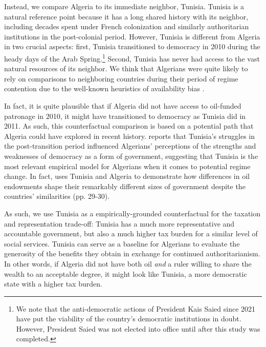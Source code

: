 \documentclass[12pt, letterpaper]{article}
\begin{document}
Instead, we compare Algeria to its immediate neighbor, Tunisia. Tunisia is a natural reference point because it has a long shared history with its neighbor, including decades spent under French colonization and similarly authoritarian institutions in the post-colonial period. However, Tunisia is different from Algeria in two crucial aspects: first, Tunisia transitioned to democracy in 2010 during the heady days of the Arab Spring.\footnote{We note that the anti-democratic actions of President Kais Saied since 2021 have put the viability of the country's democratic institutions in doubt. However, President Saied was not elected into office until after this study was completed.} Second, Tunisia has never had access to the vast natural resources of its neighbor. We think that Algerians were quite likely to rely on comparisons to neighboring countries during their period of regime contention due to the well-known heuristics of availability bias \parencite{weyland_arab_2012}. 

In fact, it is quite plausible that if Algeria did not have access to oil-funded patronage in 2010, it might have transitioned to democracy as Tunisia did in 2011. As such, this counterfactual comparison is based on a potential path that Algeria could have explored in recent history. \textcite{benstead_why_2014} reports that Tunisia's struggles in the post-transition period influenced Algerians' perceptions of the strengths and weaknesses of democracy as a form of government, suggesting that Tunisia is the most relevant empirical model for Algerians when it comes to potential regime change. In fact, \textcite{ross_oil_2012} uses Tunisia and Algeria to demonstrate how differences in oil endowments shape their remarkably different sizes of government despite the countries' similarities (pp. 29-30). 

As such, we  use Tunisia as a empirically-grounded counterfactual for the taxation and representation trade-off: Tunisia has a much more representative and accountable government, but also a much higher tax burden for a similar level of social services. Tunisia can serve as a baseline for Algerians to evaluate the generosity of the benefits they obtain in exchange for continued authoritarianism. In other words, if Algeria did not have both oil \emph{and} a ruler willing to share the wealth to an acceptable degree, it might look like Tunisia, a more democratic state with a higher tax burden. 
\end{document}
